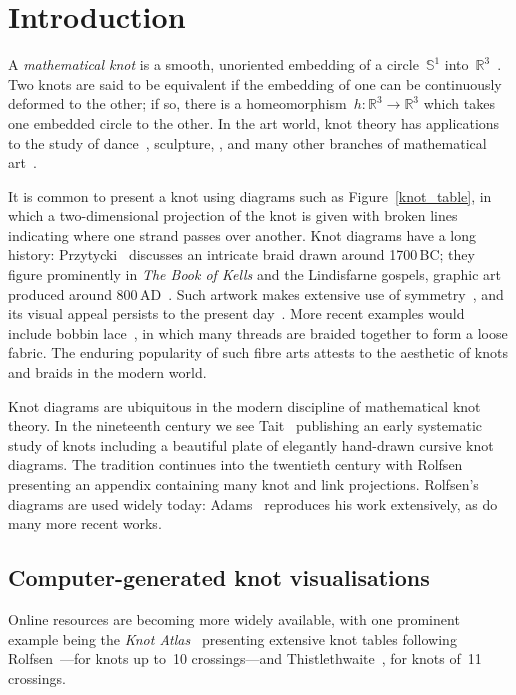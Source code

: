 \documentclass{birkjour}
\theoremstyle{definition}
\theoremstyle{remark}
\numberwithin{equation}{section}
\begin{document}
\section{Introduction}

A {\em mathematical knot} is a smooth, unoriented embedding of a
circle~$\mathbb{S}^1$ into~$\mathbb{R}^3$~\cite{manturov2004,adams2004}.  Two
knots are said to be equivalent if the embedding of one can be
continuously deformed to the other; if so, there is a
homeomorphism~$h\colon\mathbb{R}^3\longrightarrow\mathbb{R}^3$ which
takes one embedded circle to the other.  In the art world, knot theory
has applications to the study of dance~\cite{khorami2020}, sculpture,
\cite{bosch2010, widmark2020}, and many other branches of mathematical
art~\cite{hart2008}.

It is common to present a knot using diagrams such as
Figure~\ref{knot_table}, in which a two-dimensional projection of the
knot is given with broken lines indicating where one strand passes
over another.  Knot diagrams have a long history:
Przytycki~\cite{przytycki1998} discusses an intricate braid drawn
around 1700\,BC; they figure prominently in {\em The Book of Kells}
and the Lindisfarne gospels, graphic art produced around
800\,AD~\cite{bain1973}.  Such artwork makes extensive use of
symmetry~\cite{cromwell2008}, and its visual appeal persists to the
present day~\cite{antonsen2021}.  More recent examples would include
bobbin lace~\cite{irvine2020}, in which many threads are braided
together to form a loose fabric.  The enduring popularity of such
fibre arts attests to the aesthetic of knots and braids in the modern
world.

Knot diagrams are ubiquitous in the modern discipline of mathematical
knot theory.  In the nineteenth century we see Tait~\cite{tait1884}
publishing an early systematic study of knots including a beautiful
plate of elegantly hand-drawn cursive knot diagrams.  The tradition
continues into the twentieth century with Rolfsen~\cite{rolfsen1976}
presenting an appendix containing many knot and link projections.
Rolfsen's diagrams are used widely today: Adams~\cite{adams2004}
reproduces his work extensively, as do many more recent works.

\subsection{Computer-generated knot visualisations}

Online resources are becoming more widely available, with one
prominent example being the {\em Knot Atlas}~\cite{knot_atlas}
presenting extensive knot tables following
Rolfsen~\cite{rolfsen1976}---for knots up to~10 crossings---and
Thistlethwaite~\cite{hoste1998}, for knots of~11 crossings.
\end{document}
